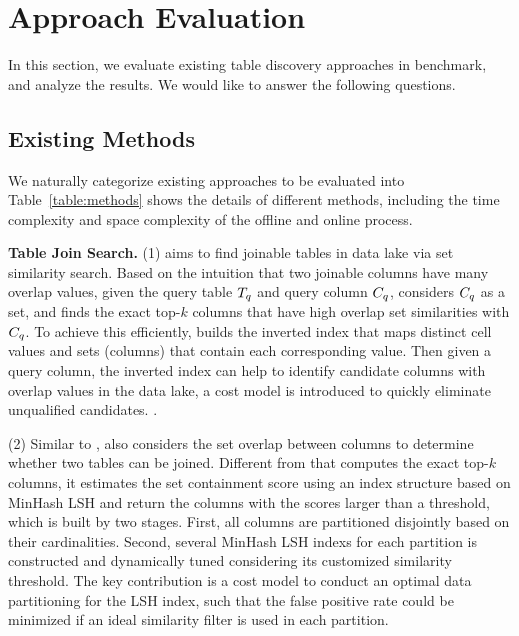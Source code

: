 \section{Approach Evaluation} 
In this section, we evaluate existing table discovery approaches in \sys benchmark, and analyze the results.
We would like to answer the following questions. 


\subsection{Existing Methods}
We naturally categorize existing approaches to be evaluated into  Table~\ref{table:methods} shows the details of different methods, including the time complexity and space complexity of the offline and online process. 



\noindent\textbf{Table Join Search.} (1) \josie aims to find joinable tables in data lake via set similarity search. Based on the intuition that two joinable columns have many overlap values, given the query table $T_q$ and query column $C_q$,  \josie considers $C_q$ as a set, and finds the  exact top-$k$ columns  that have high overlap set similarities with $C_q$. %
 To achieve this efficiently, \josie builds the inverted index that maps distinct cell values and sets (columns) that contain each corresponding value. Then given a query column, the inverted index can help to identify candidate columns with overlap values in the data lake, a cost model is introduced to quickly eliminate unqualified candidates.  .
 	
 
 \noindent  (2) Similar to \josie, \lsh also considers the set overlap between columns to determine whether two tables can be joined.  Different from \josie that computes the exact top-$k$ columns, it estimates the set containment score using an index structure based on MinHash LSH and return the columns with the scores larger than a threshold, which is  built by two stages. First, all columns are partitioned disjointly based on their cardinalities. Second, several MinHash LSH indexs for each partition is constructed and dynamically tuned considering its customized  similarity threshold. The key contribution is a cost model to conduct an optimal data partitioning for the LSH index, such that the false positive rate could be minimized if an ideal  similarity filter is used in each partition. 
 
